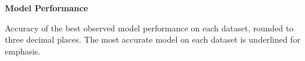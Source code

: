 
\begin{table*}[htbp]
    \renewcommand{\familydefault}{\sfdefault}\normalfont
    \centering
    \caption{\bf Model Performance}

    \begin{tableminipage}{\textwidth}

        

        \label{tab:model-comparison}
        \footnotesize  

        Accuracy of the best observed model performance on each dataset,
        rounded to three decimal places. The most accurate model on 
        each dataset is underlined for emphasis. 
        
    \end{tableminipage}
\end{table*}
